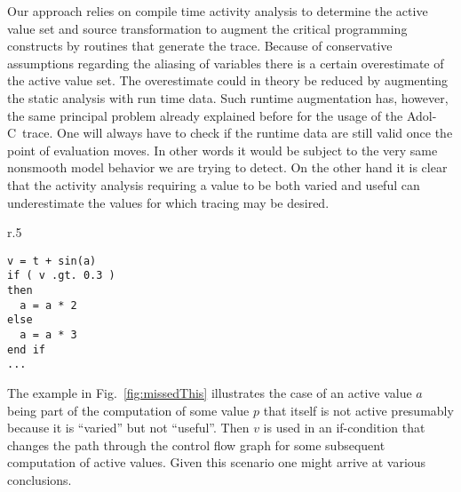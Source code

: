 \documentclass{article}
\newcommand{\adolc}{Adol-C}
\newcommand{\reffig}[1]{{Fig.~\ref{#1}}}
\begin{document}
Our approach relies on compile time activity analysis to determine the active value set 
and source transformation to augment the critical programming constructs by 
routines that generate the trace. 
Because of conservative assumptions regarding the 
aliasing of variables there is a certain overestimate of the active value set. 
The overestimate could in theory be reduced by augmenting the static analysis 
with run time data. 
Such runtime augmentation has,  however,  the same principal problem already 
explained before for the usage of the \adolc\  trace. 
One will always have to check 
if the runtime data are still valid once the point of evaluation moves. 
In other words it would be subject to the very same nonsmooth model behavior we are trying to detect.
On the other hand it is clear that the activity  analysis requiring a value 
to be both varied and useful can underestimate 
the values for which tracing may be desired. 
\begin{wrapfigure}{r}{.5\textwidth}
\begin{minipage}{.95\linewidth}
\begin{lstlisting}[frame=single]
v = t + sin(a) 
if ( v .gt. 0.3 )
then 
  a = a * 2
else
  a = a * 3
end if 
...
\end{lstlisting}
\end{minipage}
\caption{A control flow decision depending on a nonactive variable}\label{fig:missedThis} 
\end{wrapfigure}
The example in \reffig{fig:missedThis} illustrates the case of an active value  $a$
being part of the computation of some value $p$ that itself is not active presumably 
because it is ``varied'' but not ``useful''.
Then $v$ is used in an if-condition that changes the path through the control flow 
graph for some  subsequent computation of active values.
Given this scenario one might arrive at various conclusions. 
\end{document}
